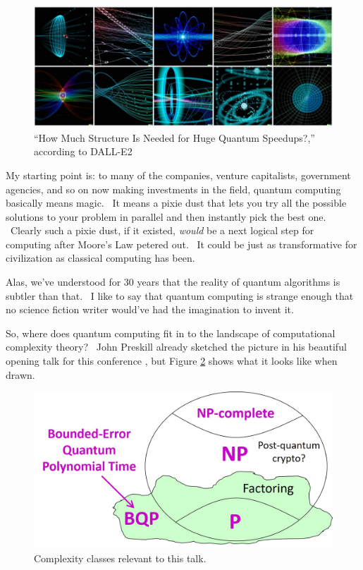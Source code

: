 \documentclass[12pt]{article}
\begin{document}
\begin{figure}[bt]
\includegraphics[width=5.8in]{dalle.jpg}
\caption{``How Much Structure Is Needed for Huge Quantum Speedups?,'' according to DALL-E2}
\label{dalle}
\end{figure}

My starting point is: to many of the companies, venture capitalists, government agencies, and so on now making investments in the field, quantum computing basically means magic. \ It means a pixie dust that lets you try all the possible solutions to your problem in parallel and then instantly pick the best one. \ Clearly such a pixie dust, if it existed, \emph{would} be a next logical step for computing after Moore's Law petered out. \ It could be just as transformative for civilization as classical computing has been.

Alas, we've understood for 30 years that the reality of quantum algorithms is subtler than that. \ I like to say that quantum computing is strange enough that no science fiction writer would've had the imagination to invent it.

So, where does quantum computing fit in to the landscape of computational complexity theory? \ John Preskill already sketched the picture in his beautiful opening talk for this conference \cite{preskill:solvay}, but Figure \ref{classes} shows what it looks like when drawn.

\begin{figure}
\includegraphics[width=5.5in]{classes.jpg}
\caption{Complexity classes relevant to this talk.}
\label{classes}
\end{figure}
\end{document}
